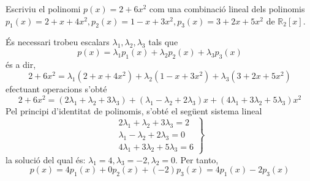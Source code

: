 \begin{exercici}
Escriviu el polinomi $p(x)=2+6x^{2}$ com una combinació lineal dels
polinomis $p_{1}(x)=2+x+4x^{2},p_{2}(x)=1-x+3x^{2},p_{3}(x)=3+2x+5x^{2}$ de
$\mathbb{R}_{2}\left[ x\right] $.

\end{exercici}
\begin{solucio}
És necessari trobeu escalars $\lambda _{1},\lambda _{2},\lambda _{3}$ tals
que%
\begin{equation*}
p(x)=\lambda _{1}p_{1}(x)+\lambda _{2}p_{2}(x)+\lambda _{3}p_{3}(x)
\end{equation*}%
és a dir,%
\begin{equation*}
2+6x^{2}=\lambda _{1}(2+x+4x^{2})+\lambda _{2}(1-x+3x^{2})+\lambda
_{3}(3+2x+5x^{2})
\end{equation*}%
efectuant operacions s’obté%
\begin{equation*}
2+6x^{2}=(2\lambda _{1}+\lambda _{2}+3\lambda _{3})+(\lambda _{1}-\lambda
_{2}+2\lambda _{3})x+(4\lambda _{1}+3\lambda _{2}+5\lambda _{3})x^{2}
\end{equation*}%
Pel principi d'identitat de polinomis, s’obté el següent
sistema lineal%
\begin{equation*}
\left.
\begin{array}{r}
2\lambda _{1}+\lambda _{2}+3\lambda _{3}=2 \\
\lambda _{1}-\lambda _{2}+2\lambda _{3}=0 \\
4\lambda _{1}+3\lambda _{2}+5\lambda _{3}=6%
\end{array}%
\right\}
\end{equation*}%
la solució del qual és: $\lambda _{1}=4,\lambda _{3}=-2,\lambda _{2}=0$. Per
tanto,%
\begin{equation*}
p(x)=4p_{1}(x)+0p_{2}(x)+(-2)p_{3}(x)=4p_{1}(x)-2p_{3}(x)
\end{equation*}
\end{solucio}

